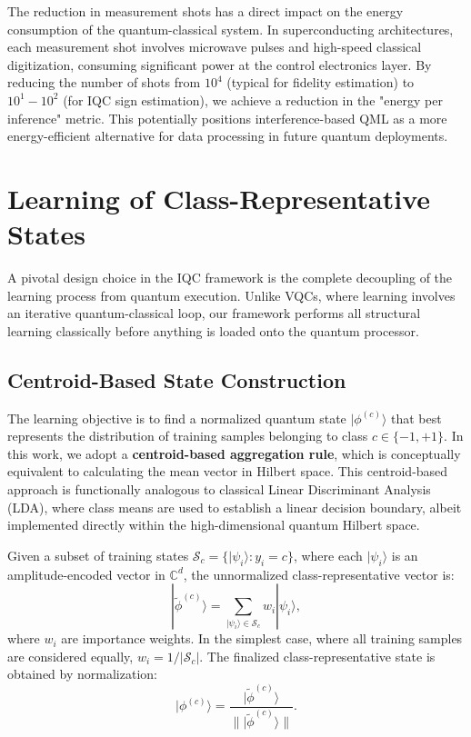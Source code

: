 \documentclass[conference]{IEEEtran}
\begin{document}
The reduction in measurement shots has a direct impact on the energy consumption of the quantum-classical system. In superconducting architectures, each measurement shot involves microwave pulses and high-speed classical digitization, consuming significant power at the control electronics layer. By reducing the number of shots from $10^4$ (typical for fidelity estimation) to $10^1-10^2$ (for IQC sign estimation), we achieve a reduction in the "energy per inference" metric. This potentially positions interference-based QML as a more energy-efficient alternative for data processing in future quantum deployments.

\section{Learning of Class-Representative States}

A pivotal design choice in the IQC framework is the complete decoupling of the learning process from quantum execution. Unlike VQCs, where learning involves an iterative quantum-classical loop, our framework performs all structural learning classically before anything is loaded onto the quantum processor.

\subsection{Centroid-Based State Construction}

The learning objective is to find a normalized quantum state $|\phi^{(c)}\rangle$ that best represents the distribution of training samples belonging to class $c \in \{-1, +1\}$. In this work, we adopt a \textbf{centroid-based aggregation rule}, which is conceptually equivalent to calculating the mean vector in Hilbert space. This centroid-based approach is functionally analogous to classical Linear Discriminant Analysis (LDA), where class means are used to establish a linear decision boundary, albeit implemented directly within the high-dimensional quantum Hilbert space.

Given a subset of training states $\mathcal{S}_c = \{|\psi_i\rangle : y_i = c\}$, where each $|\psi_i\rangle$ is an amplitude-encoded vector in $\mathbb{C}^d$, the unnormalized class-representative vector is:
\begin{equation}
| \tilde{\phi}^{(c)} \rangle = \sum_{|\psi_i\rangle \in \mathcal{S}_c} w_i |\psi_i\rangle,
\end{equation}
where $w_i$ are importance weights. In the simplest case, where all training samples are considered equally, $w_i = 1/|\mathcal{S}_c|$. The finalized class-representative state is obtained by normalization:
\begin{equation}
|\phi^{(c)}\rangle = \frac{| \tilde{\phi}^{(c)} \rangle}{\| | \tilde{\phi}^{(c)} \rangle \|}.
\end{equation}
\end{document}
